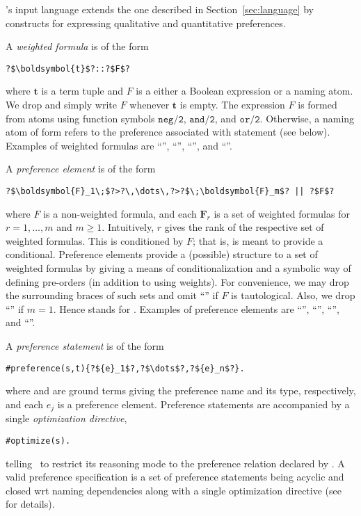 \asprin's input language extends the one described in Section~\ref{sec:language} by constructs for expressing qualitative and quantitative preferences.

A \emph{weighted formula} is of the form
\begin{lstlisting}[numbers=none,escapechar=?]
?$\boldsymbol{t}$?::?$F$?
\end{lstlisting}
where $\boldsymbol{t}$ is a term tuple and $F$ is a either a Boolean expression or a naming atom.
We drop \code{::} and simply write $F$ whenever $\boldsymbol{t}$ is empty.
The expression
$F$ is formed from atoms using function symbols $\mathtt{neg/2}$, $\mathtt{and/2}$, and $\mathtt{or/2}$.
%
Otherwise, a naming atom of form 
refers to the preference associated with statement  (see below).
%
Examples of weighted formulas are 
``'', 
``'', 
``'', and 
``''. 

A \emph{preference element} is of the form
\begin{lstlisting}[numbers=none,escapechar=?]
?$\boldsymbol{F}_1\;$?>?\,\dots\,?>?$\;\boldsymbol{F}_m$? || ?$F$?
\end{lstlisting}
where $F$ is a non-weighted formula, and each $\boldsymbol{F}_r$
is a set of weighted formulas for $r=1,\dots,m$ and $m\geq 1$.
%
Intuitively, $r$ gives the rank of the respective set of weighted formulas.
This is conditioned by $F$; that is, \code{||} is meant to provide a conditional.
Preference elements provide a (possible) structure to a set of weighted formulas
by giving a means of conditionalization and a symbolic way of defining pre-orders (in addition to using weights).
%
For convenience, we may drop the surrounding braces of such sets
and omit ``'' if $F$ is tautological.
Also, we drop ``\code{>}'' if $m=1$.
%
Hence
 stands for 
. 
%
Examples of preference elements are 
``'',  
``'', 
``'',  and
``''.

A \emph{preference statement} is of the form
%
\begin{lstlisting}[numbers=none,escapechar=?]
#preference(s,t){?${e}_1$?,?$\dots$?,?${e}_n$?}.
\end{lstlisting}
%
where  and  are ground terms giving the preference name and its type,
respectively, and each $e_j$ is a preference element.
%
Preference statements are accompanied by a single
\emph{optimization directive},
\begin{lstlisting}[numbers=none,escapechar=?]
#optimize(s).
\end{lstlisting}
telling \asprin\ to restrict its reasoning mode to the preference relation declared by .
% 
A valid {preference specification} is a set of preference statements
being acyclic and closed wrt naming dependencies
along with a single optimization directive
(see \cite{brderosc15a} for details).

